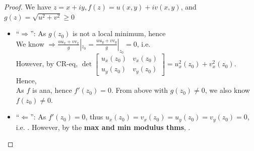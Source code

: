 \documentclass[12pt,a4paper]{article}
\begin{document}
\begin{proof}
  We have $z = x + iy, f(z) = u(x, y) + iv(x, y)$, and $g(z) = \sqrt{u^2 + v^2} \geq 0$

  \begin{itemize}
    \item ``$\Rightarrow$'': As $g(z_0)$ is not a local minimum, hence  \\
    
    We know  $\Rightarrow \frac{uu_x + vv_x}{g}|_{z_0} = \frac{uu_y + vv_y}{g}|_{z_0} = 0$, i.e.  \\

    However, by CR-eq, $\det\begin{bmatrix}
      u_x(z_0) & v_x(z_0) \\
      u_y(z_0) & v_y(z_0)
    \end{bmatrix} = u_x^2(z_0) + v_x^2(z_0)$. Hence,  \\

    As $f$ is ana, hence $f'(z_0) = 0$. From above with $g(z_0) \neq 0$, we also know $f(z_0) \neq 0$.

    \item ``$\Leftarrow$'': As $f'(z_0) = 0$, thus $u_x(z_0) = v_x(z_0) = u_y(z_0) = v_y(z_0) = 0$, i.e. . However, by the \textbf{max and min modulus thms}, .
  \end{itemize}
\end{proof}



\end{document}
